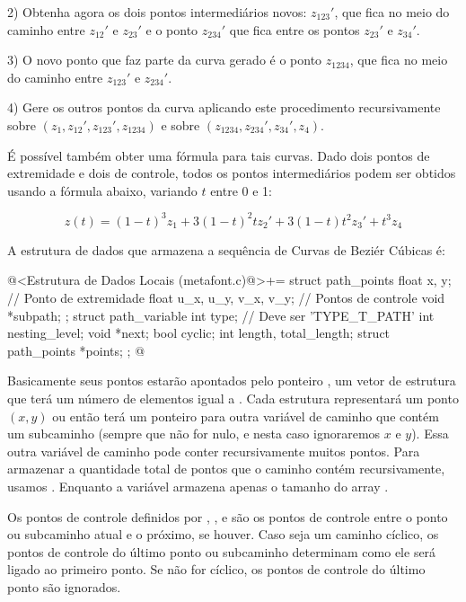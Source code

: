2) Obtenha agora os dois pontos intermediários novos: $z_{123}'$, que
fica no meio do caminho entre $z_{12}'$ e $z_{23}'$ e o ponto
$z_{234}'$ que fica entre os pontos $z_{23}'$ e $z_{34}'$.

3) O novo ponto que faz parte da curva gerado é o ponto $z_{1234}$,
que fica no meio do caminho entre $z_{123}'$ e $z_{234}'$.

4) Gere os outros pontos da curva aplicando este procedimento
recursivamente sobre $(z_1, z_{12}', z_{123}', z_{1234})$ e sobre
$(z_{1234}, z_{234}', z_{34}', z_4)$.

É possível também obter uma fórmula para tais curvas. Dado dois pontos
de extremidade e dois de controle, todos os pontos intermediários
podem ser obtidos usando a fórmula abaixo, variando $t$ entre 0 e 1:

$$
z(t) = (1-t)^3z_1 + 3(1-t)^2tz_2' + 3(1-t)t^2z_3'+t^3z_4
$$

A estrutura de dados que armazena a sequência de Curvas de Beziér
Cúbicas é:

\iniciocodigo
@<Estrutura de Dados Locais (metafont.c)@>+=
struct path_points{
  float x, y; // Ponto de extremidade
  float u_x, u_y, v_x, v_y;   // Pontos de controle
  void *subpath;
};
struct path_variable{
  int type; // Deve ser 'TYPE_T_PATH'
  int nesting_level;
  void *next;
  bool cyclic;
  int length, total_length;
  struct path_points *points;
};
@
\fimcodigo

Basicamente seus pontos estarão apontados pelo
ponteiro , um vetor de estrutura que terá um número
de elementos igual a . Cada estrutura representará
um ponto $(x, y)$ ou então terá um ponteiro para outra variável de
caminho que contém um subcaminho (sempre que  não
for nulo, e nesta caso ignoraremos $x$ e $y$). Essa outra variável de
caminho pode conter recursivamente muitos pontos. Para armazenar a
quantidade total de pontos que o caminho contém recursivamente,
usamos . Enquanto a
variável  armazena apenas o tamanho do
array .

Os pontos de controle definidos
por , , 
e  são os pontos de controle entre o ponto ou
subcaminho atual e o próximo, se houver. Caso seja um caminho cíclico,
os pontos de controle do último ponto ou subcaminho determinam como
ele será ligado ao primeiro ponto. Se não for cíclico, os pontos de
controle do último ponto são ignorados.

